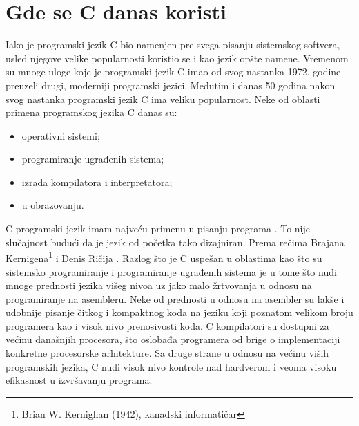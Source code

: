 \documentclass[a4paper]{article}
\begin{document}
\section{Gde se C danas koristi}
Iako je programski jezik C bio namenjen pre svega pisanju sistemskog softvera, usled njegove velike popularnosti koristio se i kao jezik opšte namene. Vremenom su mnoge uloge koje je programski jezik C imao od svog nastanka 1972. godine preuzeli drugi, moderniji programski jezici. Međutim i danas 50 godina nakon svog nastanka programski jezik C ima veliku popularnost. Neke od oblasti primena programskog jezika C danas su:
\begin{itemize}
    \item operativni sistemi;
    \item programiranje ugrađenih sistema;
    \item izrada kompilatora i interpretatora;
    \item u obrazovanju.
\end{itemize}
C programski jezik imam najveću primenu u pisanju programa . To nije slučajnost budući da je jezik od početka tako dizajniran. Prema rečima Brajana Kernigena\footnote{Brian W. Kernighan (1942), kanadski informatičar} i Denis Ričija . Razlog što je C uspešan u oblastima kao što su sistemsko programiranje i programiranje ugrađenih sistema je u tome što nudi mnoge prednosti jezika višeg nivoa uz jako malo žrtvovanja u odnosu na programiranje na asembleru. Neke od prednosti u odnosu na asembler su lakše i udobnije pisanje čitkog i kompaktnog koda na jeziku koji poznatom velikom broju programera kao i visok nivo prenosivosti koda. C kompilatori su dostupni za većinu današnjih procesora, što oslobađa programera od brige o implementaciji konkretne procesorske arhitekture. Sa druge strane u odnosu na većinu viših programskih jezika, C nudi visok nivo kontrole nad hardverom i veoma visoku efikasnost u izvršavanju programa\cite{Programming Embedded Systems}.
\end{document}
